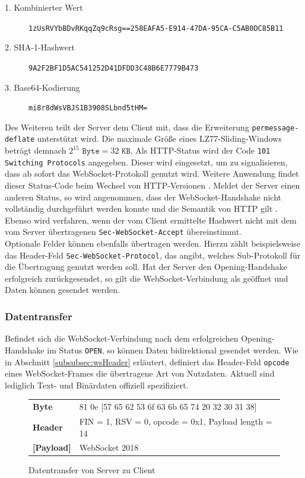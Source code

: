 \documentclass[11pt,a4paper,titlepage]{scrartcl}
\numberwithin{equation}{section}
\begin{document}
\begin{description}
	\item[1. Kombinierter Wert] \texttt{1zUsRVYbBDvRKqqZq9cRsg==258EAFA5-E914-47DA-95CA-C5AB0DC85B11}
	\item[2. SHA-1-Hashwert] \texttt{9A2F2BF1D5AC541252D41DFDD3C48B6E7779B473}
	\item[3. Base64-Kodierung] \texttt{mi8r8dWsVBJS1B3908SLbnd5tHM=}
\end{description}

\noindent Des Weiteren teilt der Server dem Client mit, dass die Erweiterung \texttt{permessage-deflate} unterstützt wird. Die maximale Größe eines LZ77-Sliding-Windows beträgt demnach $ 2^{15} \texttt{ Byte} =  32 \texttt{ KB}$. Als HTTP-Status wird der Code \texttt{101 Switching Protocols} angegeben. Dieser wird eingesetzt, um zu signalisieren, dass ab sofort das WebSocket-Protokoll genutzt wird. Weitere Anwendung findet dieser Status-Code beim Wechsel von HTTP-Versionen \autocite{leach_hypertext_1999}. Meldet der Server einen anderen Status, so wird angenommen, dass der WebSocket-Handshake nicht vollständig durchgeführt werden konnte und die Semantik von HTTP gilt \autocite[7]{fette_websocket_2011}. Ebenso wird verfahren, wenn der vom Client ermittelte Hashwert nicht mit dem vom Server übertragenen \texttt{Sec-WebSocket-Accept} übereinstimmt.\\

\noindent Optionale Felder können ebenfalls übertragen werden. Hierzu zählt beispielsweise das Header-Feld \texttt{Sec-WebSocket-Protocol}, das angibt, welches Sub-Protokoll für die Übertragung genutzt werden soll. Hat der Server den Opening-Handshake erfolgreich zurückgesendet, so gilt die WebSocket-Verbindung als geöffnet und Daten können gesendet werden.

\subsubsection{Datentransfer}\label{subsubsec:wsData}
Befindet sich die WebSocket-Verbindung nach dem erfolgreichen Opening-Handshake im Status \texttt{OPEN}, so können Daten bidirektional gesendet werden. Wie in Abschnitt \ref{subsubsec:wsHeader} erläutert, definiert das Header-Feld \texttt{opcode} eines WebSocket-Frames die übertragene Art von Nutzdaten. Aktuell sind lediglich Text- und Binärdaten offiziell spezifiziert. 

\begin{figure}[ht]
	\begin{center}
		\begin{tabular}{ll}
			\textbf{Byte} & 81 0e [57 65 62 53 6f 63 6b 65 74 20 32 30 31 38] \\
			\textbf{Header} & FIN = 1, RSV = 0, opcode = 0x1, Payload length = 14 \\
			 \textbf{[Payload]} & WebSocket 2018 \\
		\end{tabular}
	\vspace{-5mm}
	\end{center}
	\caption{Datentransfer von Server zu Client}
	\label{fig:wsDataTransfer}
\end{figure}
\end{document}
